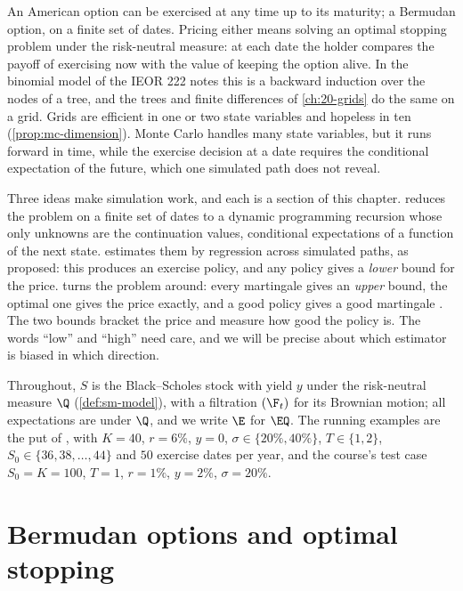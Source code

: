 
An American option can be exercised at any time up to its maturity; a Bermudan option, on a
finite set of dates. Pricing either means solving an optimal stopping problem under the
risk-neutral measure: at each date the holder compares the payoff of exercising now with
the value of keeping the option alive. In the binomial model of the IEOR 222 notes this is
a backward induction over the nodes of a tree, and the trees and finite differences of
\cref{ch:20-grids} do the same on a grid. Grids are efficient in one or two state
variables and hopeless in ten (\cref{prop:mc-dimension}). Monte Carlo handles many state
variables, but it runs forward in time, while the exercise decision at a date requires the
conditional expectation of the future, which one simulated path does not reveal.

Three ideas make simulation work, and each is a section of this chapter.
 reduces the problem on a finite set of dates to a dynamic programming
recursion whose only unknowns are the continuation values, conditional expectations of a
function of the next state.  estimates them by regression across
simulated paths, as \textcite{longstaff-schwartz} proposed: this produces an exercise
policy, and any policy gives a \emph{lower} bound for the price. 
turns the problem around: every martingale gives an \emph{upper} bound, the optimal one
gives the price exactly, and a good policy gives a good martingale
\citep{rogers-duality,haugh-kogan,andersen-broadie}. The two bounds bracket the price and
measure how good the policy is. The words ``low'' and ``high'' need care, and we will be
precise about which estimator is biased in which direction.

Throughout, $S$ is the Black--Scholes stock with yield $y$ under the risk-neutral measure
$\Q$ (\cref{def:sm-model}), with a filtration $(\F_t)$ for its Brownian motion; all
expectations are under $\Q$, and we write $\E$ for $\EQ$. The running examples are the put of
\textcite{longstaff-schwartz}, with $K=40$, $r=6\%$, $y=0$, $\sigma\in\{20\%,40\%\}$,
$T\in\{1,2\}$, $S_0\in\{36,38,\dots,44\}$ and $50$ exercise dates per year, and the
course's test case $S_0=K=100$, $T=1$, $r=1\%$, $y=2\%$, $\sigma=20\%$.

\section{Bermudan options and optimal stopping}\label{sec:am-dp}

